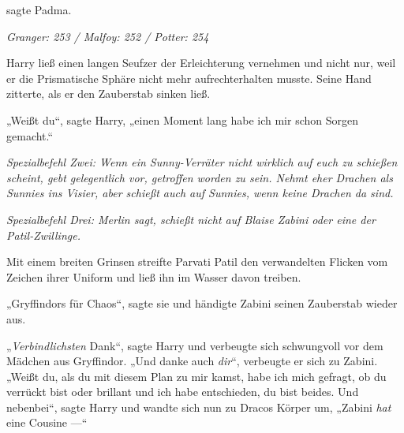  sagte Padma.

\later

\emph{Granger: 253 / Malfoy: 252 / Potter: 254}

Harry ließ einen langen Seufzer der Erleichterung vernehmen und nicht nur, weil er die Prismatische Sphäre nicht mehr aufrechterhalten musste. Seine Hand zitterte, als er den Zauberstab sinken ließ.

„Weißt du“, sagte Harry, „einen Moment lang habe ich mir schon Sorgen gemacht.“

\emph{Spezialbefehl Zwei: Wenn ein Sunny-Verräter nicht wirklich auf euch zu schießen scheint, gebt gelegentlich vor, getroffen worden zu sein. Nehmt eher Drachen als Sunnies ins Visier, aber schießt auch auf Sunnies, wenn keine Drachen da sind.}

\emph{Spezialbefehl Drei: Merlin sagt, schießt nicht auf Blaise Zabini oder eine der Patil-Zwillinge.}

Mit einem breiten Grinsen streifte Parvati Patil den verwandelten Flicken vom Zeichen ihrer Uniform und ließ ihn im Wasser davon treiben.

„Gryffindors für Chaos“, sagte sie und händigte Zabini seinen Zauberstab wieder aus.

„\emph{Verbindlichsten} Dank“, sagte Harry und verbeugte sich schwungvoll vor dem Mädchen aus Gryffindor.
„Und danke auch \emph{dir}“, verbeugte er sich zu Zabini.
„Weißt du, als du mit diesem Plan zu mir kamst, habe ich mich gefragt, ob du verrückt bist oder brillant und ich habe entschieden, du bist beides. Und nebenbei“, sagte Harry und wandte sich nun zu Dracos Körper um,
„Zabini \emph{hat} eine Cousine —“

